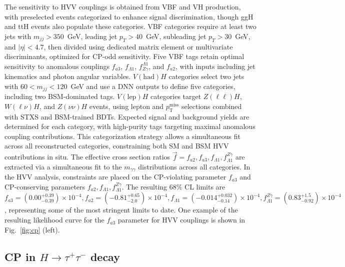 \documentclass[a4paper,11pt]{article}
\begin{document}
The sensitivity to HVV couplings is obtained from VBF and VH
production, with preselected events categorized to enhance signal
discrimination, though ggH and ttH events also populate these
categories. VBF categories require at least two jets with $m_{jj} >
350$~GeV, leading jet $p_T > 40$~GeV, subleading jet $p_T > 30$~GeV,
and $|\eta| < 4.7$, then divided using dedicated matrix element or
multivariate discriminants, optimized for CP-odd sensitivity. Five VBF
tags retain optimal sensitivity to anomalous couplings $f_{a3}$,
$f_{\Lambda1}$, $f_{Z\gamma}^{\Lambda1}$, and $f_{a2}$, with inputs
including jet kinematics and photon angular variables.
%
$V(\mathrm{had})H$ categories select two jets with $60 < m_{jj} <
120$~GeV and use a DNN outputs to define five categories, including
two BSM-dominated tags. $V(\mathrm{lep})H$ categories target
$Z(\ell\ell)H$, $W(\ell\nu)H$, and $Z(\nu\nu)H$ events, using lepton
and $p_\mathrm{T}^{\text{miss}}$ selections combined with STXS and
BSM-trained BDTs.  Expected signal and background yields are
determined for each category, with high-purity tags targeting maximal
anomalous coupling contributions. This categorization strategy allows
a simultaneous fit across all reconstructed categories, constraining
both SM and BSM HVV contributions in situ.
%
The effective cross section ratios \(\vec{f} = f_{a2}, f_{a3},
f_{\Lambda 1}, f^{Z\gamma}_{\Lambda 1}\) are extracted via a
simultaneous fit to the \(m_{\gamma\gamma}\) distributions across all
categories.  In the HVV analysis, constraints are placed on the
CP-violating parameter \(f_{a3}\) and CP-conserving parameters
\(f_{a2}, f_{\Lambda 1}, f^{Z\gamma}_{\Lambda 1}\).  The resulting
68\% CL limits are \(f_{a3} = (0.00^{+0.39}_{-0.39})\times10^{-4},
f_{a2} = (-0.81^{+0.65}_{-2.0})\times10^{-4}, f_{\Lambda 1} =
(-0.014^{+0.032}_{-0.14})\times10^{-4}, f^{Z\gamma}_{\Lambda 1} =
(0.83^{+1.5}_{-0.92})\times10^{-4}\), representing some of the most
stringent limits to date. One example of the resulting likelihood
curve for the $f_{a3}$ parameter for HVV couplings is shown in
Fig.~\ref{fig:cp} (left).





\subsection{CP in $H\to \tau^+\tau^-$ decay}
\end{document}
